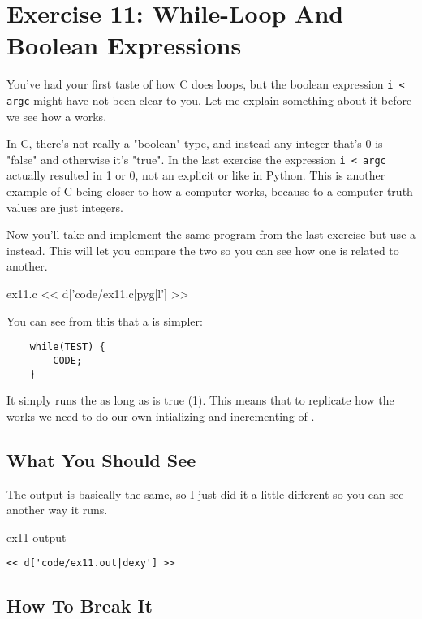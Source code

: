 \chapter{Exercise 11: While-Loop And Boolean Expressions}

You've had your first taste of how C does loops, but the boolean
expression \verb|i < argc| might have not been clear to you.  Let me
explain something about it before we see how a  
works.

In C, there's not really a "boolean" type, and instead any integer
that's 0 is "false" and otherwise it's "true".  In the last exercise
the expression \verb|i < argc| actually resulted in 1 or 0, not 
an explicit  or  like in Python.  This is
another example of C being closer to how a computer works, because
to a computer truth values are just integers.

Now you'll take and implement the same program from the last exercise
but use a  instead.  This will let you compare the
two so you can see how one is related to another.

\begin{code}{ex11.c}
<< d['code/ex11.c|pyg|l'] >>
\end{code}

You can see from this that a  is simpler:

\begin{Verbatim}
    while(TEST) {
        CODE;
    }
\end{Verbatim}

It simply runs the  as long as  is true (1).
This means that to replicate how the  works we need to
do our own intializing and incrementing of .

\section{What You Should See}

The output is basically the same, so I just did it a little different
so you can see another way it runs.

\begin{code}{ex11 output}
\begin{lstlisting}
<< d['code/ex11.out|dexy'] >>
\end{lstlisting}
\end{code}

\section{How To Break It}

